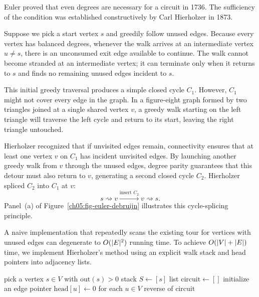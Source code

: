 Euler proved that even degrees are necessary for a circuit in 1736. The sufficiency of the condition was established constructively by Carl Hierholzer in 1873.

Suppose we pick a start vertex $s$ and greedily follow unused edges. Because every vertex has balanced degrees, whenever the walk arrives at an intermediate vertex $u \ne s$, there is an unconsumed exit edge available to continue. The walk cannot become stranded at an intermediate vertex; it can terminate only when it returns to $s$ and finds no remaining unused edges incident to $s$.

This initial greedy traversal produces a simple closed cycle $C_1$. However, $C_1$ might not cover every edge in the graph. In a figure-eight graph formed by two triangles joined at a single shared vertex $v$, a greedy walk starting on the left triangle will traverse the left cycle and return to its start, leaving the right triangle untouched.

Hierholzer recognized that if unvisited edges remain, connectivity ensures that at least one vertex $v$ on $C_1$ has incident unvisited edges. By launching another greedy walk from $v$ through the unused edges, degree parity guarantees that this detour must also return to $v$, generating a second closed cycle $C_2$. Hierholzer spliced $C_2$ into $C_1$ at $v$:
\[
s \rightsquigarrow v \xrightarrow{\text{insert } C_2} v \rightsquigarrow s.
\]
Panel~(a) of Figure~\ref{ch05:fig-euler-debruijn} illustrates this cycle-splicing principle.

A naive implementation that repeatedly scans the existing tour for vertices with unused edges can degenerate to $O(\lvert E\rvert^2)$ running time. To achieve $O(\lvert V\rvert+\lvert E\rvert)$ time, we implement Hierholzer's method using an explicit walk stack and head pointers into adjacency lists.

\begin{algorithm}[H]
\caption{Hierholzer's linear-time Eulerian circuit algorithm}
\label{ch05:alg-hierholzer}
\DontPrintSemicolon
{}
pick a vertex $s \in V$ with $\mathrm{out}(s) > 0$\;
stack $S \gets [s]$\;
list $\mathrm{circuit} \gets []$\;
initialize an edge pointer $\mathrm{head}[u] \gets 0$ for each $u \in V$\;
\Return reverse of $\mathrm{circuit}$\;
\end{algorithm}

